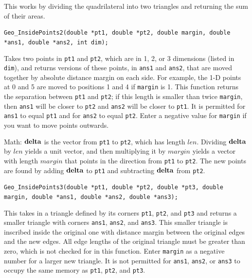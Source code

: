 \documentclass[11pt]{article}
\newcommand {\ttt} {\texttt}
\begin{document}
\begin{description}
This works by dividing the quadrilateral into two triangles and returning the sum of their areas.

\item[\underline{Inside point functions}]

\item[\ttt{double}]
\ttt{Geo\_InsidePoints2(double *pt1, double *pt2, double margin, double *ans1, double *ans2, int dim);}

Takes two points in \ttt{pt1} and \ttt{pt2}, which are in 1, 2, or 3 dimensions (listed in \ttt{dim}), and returns versions of these points, in \ttt{ans1} and \ttt{ans2}, that are moved together by absolute distance margin on each side. For example, the 1-D points at 0 and 5 are moved to positions 1 and 4 if \ttt{margin} is 1. This function returns the separation between \ttt{pt1} and \ttt{pt2}; if this length is smaller than twice \ttt{margin}, then \ttt{ans1} will be closer to \ttt{pt2} and \ttt{ans2} will be closer to \ttt{pt1}. It is permitted for \ttt{ans1} to equal \ttt{pt1} and for \ttt{ans2} to equal \ttt{pt2}. Enter a negative value for \ttt{margin} if you want to move points outwards.

Math: $\vb{delta}$ is the vector from \ttt{pt1} to \ttt{pt2}, which has length $len$. Dividing $\vb{delta}$ by $len$ yields a unit vector, and then multiplying it by $margin$ yields a vector with length $margin$ that points in the direction from \ttt{pt1} to \ttt{pt2}. The new points are found by adding $\bf{delta}$ to \ttt{pt1} and subtracting $\vb{delta}$ from \ttt{pt2}.

\item[\ttt{void}]
\ttt{Geo\_InsidePoints3(double *pt1, double *pt2, double *pt3, double margin, double *ans1, double *ans2, double *ans3);}

This takes in a triangle defined by its corners \ttt{pt1}, \ttt{pt2}, and \ttt{pt3} and returns a smaller triangle with corners \ttt{ans1}, \ttt{ans2}, and \ttt{ans3}. This smaller triangle is inscribed inside the original one with distance margin between the original edges and the new edges. All edge lengths of the original triangle must be greater than zero, which is not checked for in this function. Enter \ttt{margin} as a negative number for a larger new triangle. It is not permitted for \ttt{ans1}, \ttt{ans2}, or \ttt{ans3} to occupy the same memory as \ttt{pt1}, \ttt{pt2}, and \ttt{pt3}.


\end{description}
\end{document}
